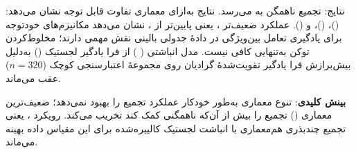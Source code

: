 نتایج: تجمیع ناهمگن  به  \textbf{} \cnum{[0.676, 0.773]} می‌رسد. نتایج به‌ازای معماری تفاوت قابل توجه نشان می‌دهد:  ()،  ()، و  (). عملکرد ضعیف‌تر ، یعنی   پایین‌تر از ، نشان می‌دهد مکانیزم‌های خودتوجه برای یادگیری تعامل بین‌ویژگی در دادۀ جدولی بالینی نقش مهمی دارند؛ مخلوط‌کردن توکن به‌تنهایی کافی نیست. مدل انباشتی   ( ) از فرا یادگیر لجستیک  () به‌دلیل بیش‌برازش فرا یادگیر تقویت‌شدۀ گرادیان روی مجموعۀ اعتبارسنجی کوچک ($n=320$) عقب می‌ماند.

\textbf{بینش کلیدی}: تنوع معماری به‌طور خودکار عملکرد تجمیع را بهبود نمی‌دهد؛ ضعیف‌ترین معماری () تجمیع را بیش از آن‌که ناهمگنی کمک کند تخریب می‌کند. رویکرد ،  یعنی تجمیع چندبذری هم‌معماری با انباشت لجستیک کالیبره‌شده برای این مقیاس داده بهینه می‌ماند.

